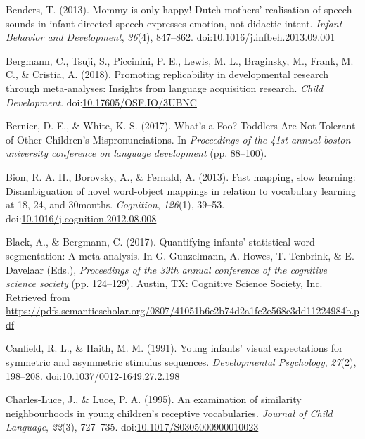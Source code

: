 \documentclass[man]{apa6}
\begin{document}
\leavevmode\hypertarget{ref-Benders2013}{}%
Benders, T. (2013). Mommy is only happy! Dutch mothers' realisation of speech sounds in infant-directed speech expresses emotion, not didactic intent. \emph{Infant Behavior and Development}, \emph{36}(4), 847--862. doi:\href{https://doi.org/10.1016/j.infbeh.2013.09.001}{10.1016/j.infbeh.2013.09.001}

\leavevmode\hypertarget{ref-Bergmann2018}{}%
Bergmann, C., Tsuji, S., Piccinini, P. E., Lewis, M. L., Braginsky, M., Frank, M. C., \& Cristia, A. (2018). Promoting replicability in developmental research through meta-analyses: Insights from language acquisition research. \emph{Child Development}. doi:\href{https://doi.org/10.17605/OSF.IO/3UBNC}{10.17605/OSF.IO/3UBNC}

\leavevmode\hypertarget{ref-Bernier2017}{}%
Bernier, D. E., \& White, K. S. (2017). What's a Foo? Toddlers Are Not Tolerant of Other Children's Mispronunciations. In \emph{Proceedings of the 41st annual boston university conference on language development} (pp. 88--100).

\leavevmode\hypertarget{ref-Bion2013}{}%
Bion, R. A. H., Borovsky, A., \& Fernald, A. (2013). Fast mapping, slow learning: Disambiguation of novel word-object mappings in relation to vocabulary learning at 18, 24, and 30months. \emph{Cognition}, \emph{126}(1), 39--53. doi:\href{https://doi.org/10.1016/j.cognition.2012.08.008}{10.1016/j.cognition.2012.08.008}

\leavevmode\hypertarget{ref-Black2017}{}%
Black, A., \& Bergmann, C. (2017). Quantifying infants' statistical word segmentation: A meta-analysis. In G. Gunzelmann, A. Howes, T. Tenbrink, \& E. Davelaar (Eds.), \emph{Proceedings of the 39th annual conference of the cognitive science society} (pp. 124--129). Austin, TX: Cognitive Science Society, Inc. Retrieved from \url{https://pdfs.semanticscholar.org/0807/41051b6e2b74d2a1fc2e568c3dd11224984b.pdf}

\leavevmode\hypertarget{ref-Canfield1991}{}%
Canfield, R. L., \& Haith, M. M. (1991). Young infants' visual expectations for symmetric and asymmetric stimulus sequences. \emph{Developmental Psychology}, \emph{27}(2), 198--208. doi:\href{https://doi.org/10.1037/0012-1649.27.2.198}{10.1037/0012-1649.27.2.198}

\leavevmode\hypertarget{ref-CharlesLuce1995}{}%
Charles-Luce, J., \& Luce, P. A. (1995). An examination of similarity neighbourhoods in young children's receptive vocabularies. \emph{Journal of Child Language}, \emph{22}(3), 727--735. doi:\href{https://doi.org/10.1017/S0305000900010023}{10.1017/S0305000900010023}
\end{document}
